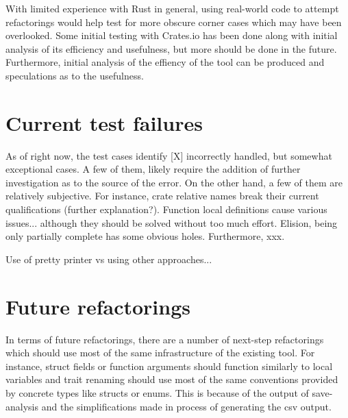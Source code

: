 
With limited experience with Rust in general, using real-world code to attempt refactorings would help test for more obscure corner cases which may have been overlooked. Some initial testing with Crates.io \cite{cratesio15} has been done along with initial analysis of its efficiency and usefulness, but more should be done in the future. Furthermore, initial analysis of the effiency of the tool can be produced and speculations as to the usefulness. 


\section{Current test failures}
As of right now, the test cases identify [X] incorrectly handled, but somewhat exceptional cases. A few of them, likely require the addition of further investigation as to the source of the error. On the other hand, a few of them are relatively subjective. For instance, crate relative names break their current qualifications (further explanation?). Function local definitions cause various issues... although they should be solved without too much effort. Elision, being only partially complete has some obvious holes. Furthermore, xxx.

Use of pretty printer vs using other approaches...

\section{Future refactorings}
In terms of future refactorings, there are a number of next-step refactorings which should use most of the same infrastructure of the existing tool. For instance, struct fields or function arguments should function similarly to local variables and trait renaming should use most of the same conventions provided by concrete types like structs or enums. This is because of the output of save-analysis and the simplifications made in process of generating the csv output.

